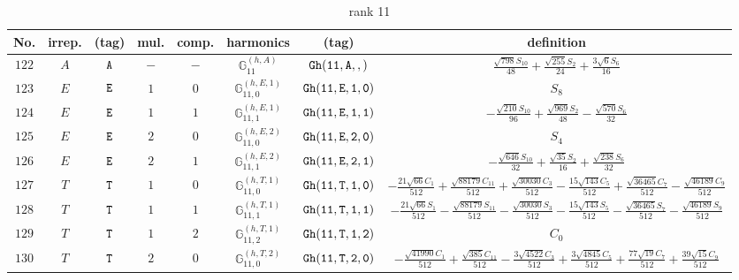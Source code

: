\documentclass[fleqn,8pt]{jsarticle}
\begin{document}
\begin{table}[ht!]
\begin{center}
\caption{rank 11}
\renewcommand{\arraystretch}{1.3}
\begin{tabular}{cccccccc} \hline \hline
No. & irrep. & (tag) & mul. & comp. & harmonics & (tag) & definition \\ \hline
$ 122 $ & $ A $ & $ {\tt A} $ & $ - $ & $ - $ & $ \mathbb{G}_{11}^{(h,A)} $ & $ {\tt Gh(11,A,,)} $ & $ \frac{\sqrt{798} S_{10}}{48} + \frac{\sqrt{255} S_{2}}{24} + \frac{3 \sqrt{6} S_{6}}{16} $ \\
$ 123 $ & $ E $ & $ {\tt E} $ & $ 1 $ & $ 0 $ & $ \mathbb{G}_{11,0}^{(h,E,1)} $ & $ {\tt Gh(11,E,1,0)} $ & $ S_{8} $ \\
$ 124 $ & $ E $ & $ {\tt E} $ & $ 1 $ & $ 1 $ & $ \mathbb{G}_{11,1}^{(h,E,1)} $ & $ {\tt Gh(11,E,1,1)} $ & $ - \frac{\sqrt{210} S_{10}}{96} + \frac{\sqrt{969} S_{2}}{48} - \frac{\sqrt{570} S_{6}}{32} $ \\
$ 125 $ & $ E $ & $ {\tt E} $ & $ 2 $ & $ 0 $ & $ \mathbb{G}_{11,0}^{(h,E,2)} $ & $ {\tt Gh(11,E,2,0)} $ & $ S_{4} $ \\
$ 126 $ & $ E $ & $ {\tt E} $ & $ 2 $ & $ 1 $ & $ \mathbb{G}_{11,1}^{(h,E,2)} $ & $ {\tt Gh(11,E,2,1)} $ & $ - \frac{\sqrt{646} S_{10}}{32} + \frac{\sqrt{35} S_{2}}{16} + \frac{\sqrt{238} S_{6}}{32} $ \\
$ 127 $ & $ T $ & $ {\tt T} $ & $ 1 $ & $ 0 $ & $ \mathbb{G}_{11,0}^{(h,T,1)} $ & $ {\tt Gh(11,T,1,0)} $ & $ - \frac{21 \sqrt{66} C_{1}}{512} + \frac{\sqrt{88179} C_{11}}{512} + \frac{\sqrt{30030} C_{3}}{512} - \frac{15 \sqrt{143} C_{5}}{512} + \frac{\sqrt{36465} C_{7}}{512} - \frac{\sqrt{46189} C_{9}}{512} $ \\
$ 128 $ & $ T $ & $ {\tt T} $ & $ 1 $ & $ 1 $ & $ \mathbb{G}_{11,1}^{(h,T,1)} $ & $ {\tt Gh(11,T,1,1)} $ & $ - \frac{21 \sqrt{66} S_{1}}{512} - \frac{\sqrt{88179} S_{11}}{512} - \frac{\sqrt{30030} S_{3}}{512} - \frac{15 \sqrt{143} S_{5}}{512} - \frac{\sqrt{36465} S_{7}}{512} - \frac{\sqrt{46189} S_{9}}{512} $ \\
$ 129 $ & $ T $ & $ {\tt T} $ & $ 1 $ & $ 2 $ & $ \mathbb{G}_{11,2}^{(h,T,1)} $ & $ {\tt Gh(11,T,1,2)} $ & $ C_{0} $ \\
$ 130 $ & $ T $ & $ {\tt T} $ & $ 2 $ & $ 0 $ & $ \mathbb{G}_{11,0}^{(h,T,2)} $ & $ {\tt Gh(11,T,2,0)} $ & $ - \frac{\sqrt{41990} C_{1}}{512} + \frac{\sqrt{385} C_{11}}{512} - \frac{3 \sqrt{4522} C_{3}}{512} + \frac{3 \sqrt{4845} C_{5}}{512} + \frac{77 \sqrt{19} C_{7}}{512} + \frac{39 \sqrt{15} C_{9}}{512} $ \\

\end{tabular}
\end{center}
\end{table}
\end{document}
